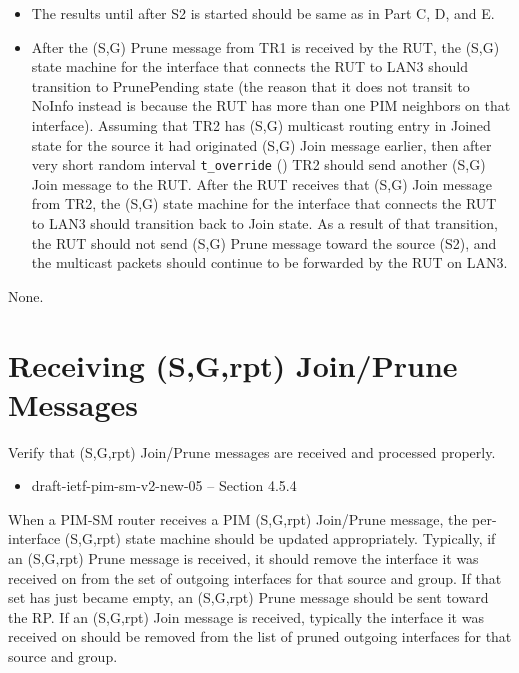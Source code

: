 \documentclass[11pt]{report}
\begin{document}

\begin{itemize}

  \item The results until after S2 is started should be same as in
  Part C, D, and E.

  \item After the (S,G) Prune message from TR1 is received by the RUT,
  the (S,G) state machine for the interface that connects the RUT to
  LAN3 should transition to PrunePending state (the reason that it does
  not transit to NoInfo instead is because the RUT has more than one PIM
  neighbors on that interface).
  Assuming that TR2 has (S,G) multicast routing entry in Joined state
  for the source it had originated (S,G) Join message earlier, then after
  very short random interval \verb=t_override= ({\PimsmTOverride}) TR2
  should send another (S,G) Join message to the RUT.
  After the RUT receives that (S,G) Join message from TR2,
  the (S,G) state machine for the interface that connects the RUT to
  LAN3 should transition back to Join state.
  As a result of that transition, the RUT should not send (S,G) Prune
  message toward the source (S2), and the multicast packets should continue
  to be forwarded by the RUT on LAN3.

\end{itemize}

None.

\newpage
\section{Receiving (S,G,rpt) Join/Prune Messages}

Verify that (S,G,rpt) Join/Prune messages are received and processed
properly.

\begin{itemize}
  \item draft-ietf-pim-sm-v2-new-05 -- Section 4.5.4
\end{itemize}

When a PIM-SM router receives a PIM (S,G,rpt) Join/Prune message, the
per-interface (S,G,rpt) state machine should be updated appropriately.
Typically, if an (S,G,rpt) Prune message is received, it should
remove the interface it was received on from the set of outgoing interfaces
for that source and group. If that set has just became empty, an (S,G,rpt)
Prune message should be sent toward the RP.
If an (S,G,rpt) Join message is received, typically the interface it was
received on should be removed from the list of pruned outgoing interfaces for
that source and group.
\end{document}
